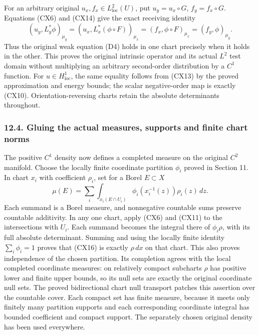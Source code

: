 \documentclass[
  11pt,
]{article}
\begin{document}
For an arbitrary original \(u_x,f_x\in L^2_{\mathrm{loc}}(U)\), put
\(u_y=u_x\circ G\), \(f_y=f_x\circ G\). Equations (CX6) and (CX14) give
the exact receiving identity \[
 (u_y,L_y^*\phi)_{\mu_y}
  =(u_x,L_x^*(\phi\circ F))_{\mu_x}
  =(f_x,\phi\circ F)_{\mu_x}
  =(f_y,\phi)_{\mu_y}.                                          \tag{CX15}
\] Thus the original weak equation (D4) holds in one chart precisely
when it holds in the other. This proves the original intrinsic operator
and its actual \(L^2\) test domain without multiplying an arbitrary
second-order distribution by a \(C^1\) function. For
\(u\in H^1_{\mathrm{loc}}\), the same equality follows from (CX13) by
the proved approximation and energy bounds; the scalar negative-order
map is exactly (CX10). Orientation-reversing charts retain the absolute
determinants throughout.

\subsubsection{12.4. Gluing the actual measures, supports and finite
chart
norms}\label{gluing-the-actual-measures-supports-and-finite-chart-norms}

The positive \(C^1\) density now defines a completed measure on the
original \(C^2\) manifold. Choose the locally finite coordinate
partition \(\phi_i\) proved in Section 11. In chart \(x_i\) with
coefficient \(\rho_i\), set for a Borel \(E\subset X\) \[
 \mu(E)=\sum_i\int_{x_i(E\cap U_i)}
       \phi_i(x_i^{-1}(z))\rho_i(z)\,dz .                        \tag{CX16}
\] Each summand is a Borel measure, and nonnegative countable sums
preserve countable additivity. In any one chart, apply (CX6) and (CX11)
to the intersections with \(U_i\). Each summand becomes the integral
there of \(\phi_i\rho\), with its full absolute determinant. Summing and
using the locally finite identity \(\sum_i\phi_i=1\) proves that (CX16)
is exactly \(\rho\,dx\) on that chart. This also proves independence of
the chosen partition. Its completion agrees with the local completed
coordinate measures: on relatively compact subcharts \(\rho\) has
positive lower and finite upper bounds, so its null sets are exactly the
original coordinate null sets. The proved bidirectional chart null
transport patches this assertion over the countable cover. Each compact
set has finite measure, because it meets only finitely many partition
supports and each corresponding coordinate integral has bounded
coefficient and compact support. The separately chosen original density
has been used everywhere.
\end{document}
